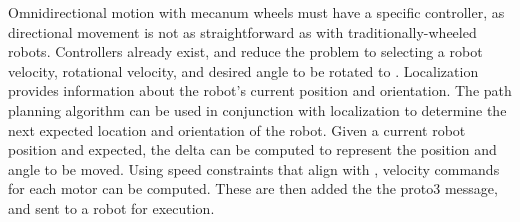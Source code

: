 Omnidirectional motion with mecanum wheels must have a specific controller, as directional movement is not as straightforward as with traditionally-wheeled robots. Controllers already exist, and reduce the problem to selecting a robot velocity, rotational velocity, and desired angle to be rotated to \cite{mecanumcontrol}. Localization provides information about the robot's current position and orientation. The path planning algorithm can be used in conjunction with localization to determine the next expected location and orientation of the robot. Given a current robot position and expected, the delta can be computed to represent the position and angle to be moved. Using speed constraints that align with , velocity commands for each motor can be computed. These are then added the the proto3 message, and sent to a robot for execution.
